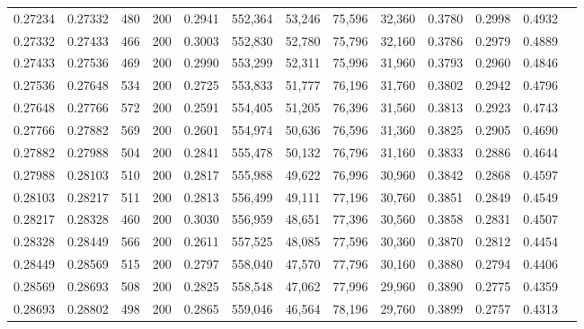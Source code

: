 \begin{tabular}{rrrrrrrrrrrrr}
0.27234 & 0.27332 &   480 & 200 &                                     0.2941 & 552,364 &  53,246 &  75,596 &  32,360 & 0.3780 & 0.2998 & 0.4932 \\
0.27332 & 0.27433 &   466 & 200 &                                     0.3003 & 552,830 &  52,780 &  75,796 &  32,160 & 0.3786 & 0.2979 & 0.4889 \\
0.27433 & 0.27536 &   469 & 200 &                                     0.2990 & 553,299 &  52,311 &  75,996 &  31,960 & 0.3793 & 0.2960 & 0.4846 \\
0.27536 & 0.27648 &   534 & 200 &                                     0.2725 & 553,833 &  51,777 &  76,196 &  31,760 & 0.3802 & 0.2942 & 0.4796 \\
0.27648 & 0.27766 &   572 & 200 &                                     0.2591 & 554,405 &  51,205 &  76,396 &  31,560 & 0.3813 & 0.2923 & 0.4743 \\
0.27766 & 0.27882 &   569 & 200 &                                     0.2601 & 554,974 &  50,636 &  76,596 &  31,360 & 0.3825 & 0.2905 & 0.4690 \\
0.27882 & 0.27988 &   504 & 200 &                                     0.2841 & 555,478 &  50,132 &  76,796 &  31,160 & 0.3833 & 0.2886 & 0.4644 \\
0.27988 & 0.28103 &   510 & 200 &                                     0.2817 & 555,988 &  49,622 &  76,996 &  30,960 & 0.3842 & 0.2868 & 0.4597 \\
0.28103 & 0.28217 &   511 & 200 &                                     0.2813 & 556,499 &  49,111 &  77,196 &  30,760 & 0.3851 & 0.2849 & 0.4549 \\
0.28217 & 0.28328 &   460 & 200 &                                     0.3030 & 556,959 &  48,651 &  77,396 &  30,560 & 0.3858 & 0.2831 & 0.4507 \\
0.28328 & 0.28449 &   566 & 200 &                                     0.2611 & 557,525 &  48,085 &  77,596 &  30,360 & 0.3870 & 0.2812 & 0.4454 \\
0.28449 & 0.28569 &   515 & 200 &                                     0.2797 & 558,040 &  47,570 &  77,796 &  30,160 & 0.3880 & 0.2794 & 0.4406 \\
0.28569 & 0.28693 &   508 & 200 &                                     0.2825 & 558,548 &  47,062 &  77,996 &  29,960 & 0.3890 & 0.2775 & 0.4359 \\
0.28693 & 0.28802 &   498 & 200 &                                     0.2865 & 559,046 &  46,564 &  78,196 &  29,760 & 0.3899 & 0.2757 & 0.4313 \\

\end{tabular}
